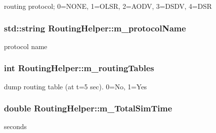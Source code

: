 routing protocol; 0=N\+O\+NE, 1=O\+L\+SR, 2=A\+O\+DV, 3=D\+S\+DV, 4=D\+SR 

\subsubsection[{\texorpdfstring{m\+\_\+protocol\+Name}{m_protocolName}}]{\setlength{\rightskip}{0pt plus 5cm}std\+::string Routing\+Helper\+::m\+\_\+protocol\+Name\hspace{0.3cm}{\ttfamily [private]}}\hypertarget{classRoutingHelper_aec432269dde7fd896550370d29fb5eca}{}\label{classRoutingHelper_aec432269dde7fd896550370d29fb5eca}


protocol name 

\subsubsection[{\texorpdfstring{m\+\_\+routing\+Tables}{m_routingTables}}]{\setlength{\rightskip}{0pt plus 5cm}int Routing\+Helper\+::m\+\_\+routing\+Tables\hspace{0.3cm}{\ttfamily [private]}}\hypertarget{classRoutingHelper_a39d850cd28027d771bb503c4f12e5986}{}\label{classRoutingHelper_a39d850cd28027d771bb503c4f12e5986}


dump routing table (at t=5 sec). 0=No, 1=Yes 

\subsubsection[{\texorpdfstring{m\+\_\+\+Total\+Sim\+Time}{m_TotalSimTime}}]{\setlength{\rightskip}{0pt plus 5cm}double Routing\+Helper\+::m\+\_\+\+Total\+Sim\+Time\hspace{0.3cm}{\ttfamily [private]}}\hypertarget{classRoutingHelper_a2aba8939d73d0ea57107d7c0ecfe6bca}{}\label{classRoutingHelper_a2aba8939d73d0ea57107d7c0ecfe6bca}


seconds 

